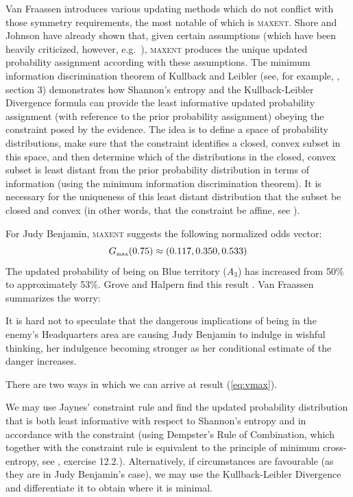 \documentclass[12pt]{article}
\begin{document}
Van Fraassen introduces various updating methods which do not conflict
with those symmetry requirements, the most notable of which is
\textsc{maxent}. Shore and Johnson have already shown that, given
certain assumptions (which have been heavily criticized, however,
e.g.\ ), \textsc{maxent} produces the unique
updated probability assignment according with these assumptions. The
minimum information discrimination theorem of Kullback and Leibler
(see, for example, , section 3) demonstrates how
Shannon's entropy and the Kullback-Leibler Divergence formula can
provide the least informative updated probability assignment (with
reference to the prior probability assignment) obeying the constraint
posed by the evidence. The idea is to define a space of probability
distributions, make sure that the constraint identifies a closed,
convex subset in this space, and then determine which of the
distributions in the closed, convex subset is least distant from the
prior probability distribution in terms of information (using the
minimum information discrimination theorem). It is necessary for the
uniqueness of this least distant distribution that the subset be
closed and convex (in other words, that the constraint be affine, see
).

For Judy Benjamin, \textsc{maxent} suggests the following normalized
odds vector:
\begin{equation}
  \label{eq:vmax}
  G_{\mbox{{\tiny max}}}(0.75)\approx(0.117,0.350,0.533)
\end{equation}
The updated probability of being on Blue territory ($A_{3}$) has
increased from 50\% to approximately 53\%. Grove and Halpern find this
result  .
Van Fraassen summarizes the worry:
\begin{quotex}
  It is hard not to speculate that the dangerous implications of being
  in the enemy's Headquarters area are causing Judy Benjamin to
  indulge in wishful thinking, her indulgence becoming stronger as her
  conditional estimate of the danger increases. 
\end{quotex}

\bigskip

\nias There are two ways in which we can arrive at result
({\ref{eq:vmax}}).

We may use Jaynes' constraint rule and find the updated probability
distribution that is both least informative with respect to Shannon's
entropy and in accordance with the constraint (using Dempster's Rule
of Combination, which together with the constraint rule is equivalent
to the principle of minimum cross-entropy, see
, exercise 12.2.). Alternatively, if
circumstances are favourable (as they are in Judy Benjamin's case), we
may use the Kullback-Leibler Divergence and differentiate it to obtain
where it is minimal.
\end{document}
